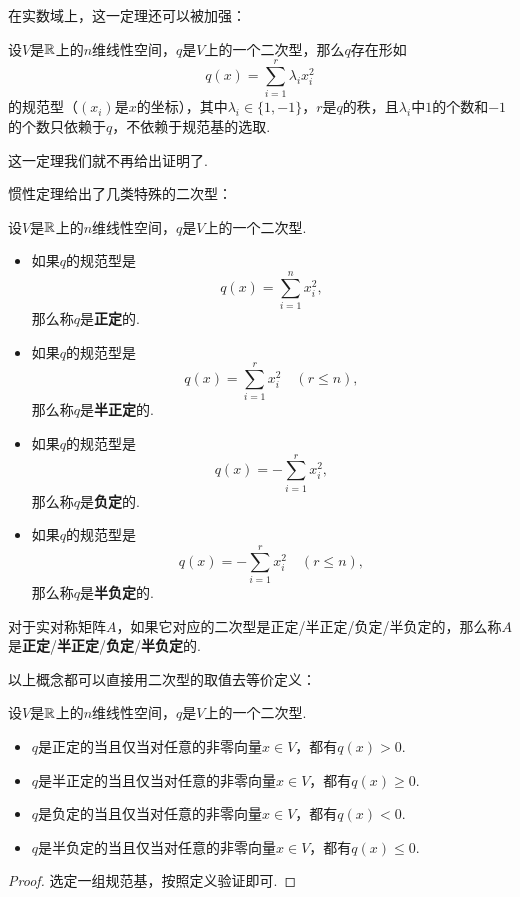 在实数域上，这一定理还可以被加强：

\begin{theorem}[惯性定理]\label{theorem:inertia-theorem}
    设$V$是$\mathbb{R}$上的$n$维线性空间，$q$是$V$上的一个二次型，那么$q$存在形如
    \[
        q(x)=\sum_{i=1}^r \lambda_i x_i^2
    \]
    的规范型（$(x_i)$是$x$的坐标），其中$\lambda_i\in\{1,-1\}$，$r$是$q$的秩，且$\lambda_i$中$1$的个数和$-1$的个数只依赖于$q$，不依赖于规范基的选取. 
\end{theorem}

这一定理我们就不再给出证明了. 

惯性定理给出了几类特殊的二次型：

\begin{definition}\label{definition:positive-definite}
    设$V$是$\mathbb{R}$上的$n$维线性空间，$q$是$V$上的一个二次型. 
    \begin{itemize}
        \item 如果$q$的规范型是
        \[
            q(x)=\sum_{i=1}^n x_i^2,
        \]
        那么称$q$是\textbf{正定}的. 
        \item 如果$q$的规范型是
        \[
            q(x)=\sum_{i=1}^r x_i^2\quad(r\leq n),
        \]
        那么称$q$是\textbf{半正定}的. 
        \item 如果$q$的规范型是
        \[
            q(x)=-\sum_{i=1}^r x_i^2,
        \]
        那么称$q$是\textbf{负定}的. 
        \item 如果$q$的规范型是
        \[
            q(x)=-\sum_{i=1}^r x_i^2\quad(r\leq n),
        \]
        那么称$q$是\textbf{半负定}的. 
    \end{itemize}

对于实对称矩阵$A$，如果它对应的二次型是正定/半正定/负定/半负定的，那么称$A$是\textbf{正定}/\textbf{半正定}/\textbf{负定}/\textbf{半负定}的. 
\end{definition}

以上概念都可以直接用二次型的取值去等价定义：
\begin{proposition}\label{proposition:positive-definite}
    设$V$是$\mathbb{R}$上的$n$维线性空间，$q$是$V$上的一个二次型. 
    \begin{itemize}
        \item $q$是正定的当且仅当对任意的非零向量$x\in V$，都有$q(x)>0$. 
        \item $q$是半正定的当且仅当对任意的非零向量$x\in V$，都有$q(x)\geq 0$. 
        \item $q$是负定的当且仅当对任意的非零向量$x\in V$，都有$q(x)<0$. 
        \item $q$是半负定的当且仅当对任意的非零向量$x\in V$，都有$q(x)\leq 0$. 
    \end{itemize}
\end{proposition}
\begin{proof}
    选定一组规范基，按照定义验证即可. 
\end{proof}

